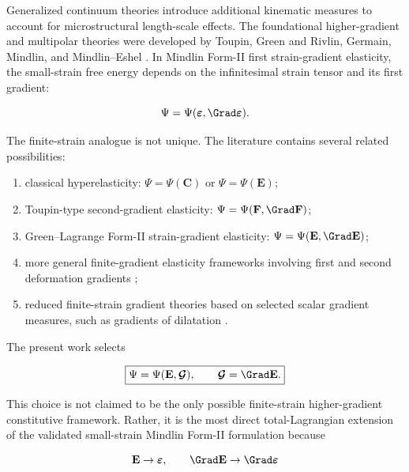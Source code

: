 \documentclass[11pt]{article}
\begin{document}
Generalized continuum theories introduce additional kinematic measures to account for microstructural length-scale effects. The foundational higher-gradient and multipolar theories were developed by Toupin, Green and Rivlin, Germain, Mindlin, and Mindlin--Eshel \cite{Toupin1962,Toupin1964,GreenRivlin1964Simple,GreenRivlin1964Multipolar,Germain1973,Mindlin1964,MindlinEshel1968}. In Mindlin Form-II first strain-gradient elasticity, the small-strain free energy depends on the infinitesimal strain tensor and its first gradient:

\begin{equation}
\Psi=\Psi(\bm{\varepsilon},\Grad\bm{\varepsilon}).
\label{eq:sec2_small_strain_formII_literature}
\end{equation}

The finite-strain analogue is not unique. The literature contains several related possibilities:

\begin{enumerate}
\item classical hyperelasticity: $\Psi=\Psi(\mathbf{C})$ or $\Psi=\Psi(\mathbf{E})$;
\item Toupin-type second-gradient elasticity: $\Psi=\Psi(\mathbf{F},\Grad\mathbf{F})$;
\item Green--Lagrange Form-II strain-gradient elasticity: $\Psi=\Psi(\mathbf{E},\Grad\mathbf{E})$;
\item more general finite-gradient elasticity frameworks involving first and second deformation gradients \cite{Bertram2015,JaviliDellIsolaSteinmann2013};
\item reduced finite-strain gradient theories based on selected scalar gradient measures, such as gradients of dilatation \cite{DellIsolaEremeyev2021}.
\end{enumerate}

The present work selects

\begin{equation}
\boxed{
\Psi=\Psi(\mathbf{E},\bm{\mathcal{G}}),
\qquad
\bm{\mathcal{G}}=\Grad\mathbf{E}.
}
\label{eq:sec2_selected_state_dependence}
\end{equation}

This choice is not claimed to be the only possible finite-strain higher-gradient constitutive framework. Rather, it is the most direct total-Lagrangian extension of the validated small-strain Mindlin Form-II formulation because

\begin{equation}
\mathbf{E}\rightarrow\bm{\varepsilon},
\qquad
\Grad\mathbf{E}\rightarrow\Grad\bm{\varepsilon}
\label{eq:sec2_formII_recovery_kinematic}
\end{equation}
\end{document}
